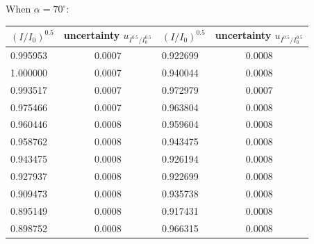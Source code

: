 \documentclass[12pt, a4paper]{article}
\begin{document}
When $\alpha = 70^{\circ}$:
\begin{table}[H]
	\centering
	\begin{tabular}{|l|cl|l|cl|}
	\hline
	$(I/I_0)^{0.5}$ & \multicolumn{2}{c|}{uncertainty   $u_{I^{0.5}/I_0^{0.5}}$} & $(I/I_0)^{0.5}$ & \multicolumn{2}{c|}{uncertainty   $u_{I^{0.5}/I_0^{0.5}}$} \\ \hline
	0.995953        & \multicolumn{2}{c|}{0.0007}                                & 0.922699        & \multicolumn{2}{c|}{0.0008}                                \\ \hline
	1.000000        & \multicolumn{2}{c|}{0.0007}                                & 0.940044        & \multicolumn{2}{c|}{0.0008}                                \\ \hline
	0.993517        & \multicolumn{2}{c|}{0.0007}                                & 0.972979        & \multicolumn{2}{c|}{0.0007}                                \\ \hline
	0.975466        & \multicolumn{2}{c|}{0.0007}                                & 0.963804        & \multicolumn{2}{c|}{0.0008}                                \\ \hline
	0.960446        & \multicolumn{2}{c|}{0.0008}                                & 0.959604        & \multicolumn{2}{c|}{0.0008}                                \\ \hline
	0.958762        & \multicolumn{2}{c|}{0.0008}                                & 0.943475        & \multicolumn{2}{c|}{0.0008}                                \\ \hline
	0.943475        & \multicolumn{2}{c|}{0.0008}                                & 0.926194        & \multicolumn{2}{c|}{0.0008}                                \\ \hline
	0.927937        & \multicolumn{2}{c|}{0.0008}                                & 0.922699        & \multicolumn{2}{c|}{0.0008}                                \\ \hline
	0.909473        & \multicolumn{2}{c|}{0.0008}                                & 0.935738        & \multicolumn{2}{c|}{0.0008}                                \\ \hline
	0.895149        & \multicolumn{2}{c|}{0.0008}                                & 0.917431        & \multicolumn{2}{c|}{0.0008}                                \\ \hline
	0.898752        & \multicolumn{2}{c|}{0.0008}                                & 0.966315        & \multicolumn{2}{c|}{0.0008}                                \\ \hline

\end{tabular}
\end{table}
\end{document}
